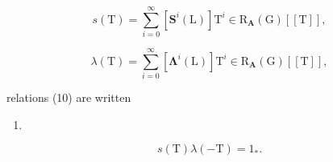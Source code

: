 \[
s (\mathrm{T}) = \sum_ {i = 0} ^ {\infty} \left[ \mathbf {S} ^ {i} (\mathrm{L}) \right] \mathrm{T} ^ {i} \in \mathrm{R} _ {\mathbf {A}} (\mathrm{G}) [ [ \mathrm{T} ] ],
\]

\[
\lambda (\mathrm{T}) = \sum_ {i = 0} ^ {\infty} \left[ \boldsymbol {\Lambda} ^ {i} (\mathrm{L}) \right] \mathrm{T} ^ {i} \in \mathrm{R} _ {\mathbf {A}} (\mathrm{G}) [ [ \mathrm{T} ] ],
\]

relations (10) are written

\begin{enumerate}
\def\labelenumi{(\arabic{enumi})}
\setcounter{enumi}{10}
\tightlist
\item
\end{enumerate}

\[
s (\mathrm{T}) \lambda (- \mathrm{T}) = 1 _ {*}.
\]

